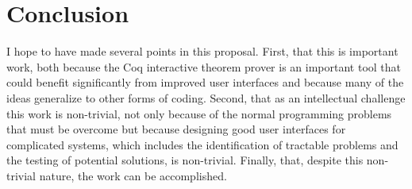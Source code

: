 \documentclass[11pt]{amsart}
\begin{document}
%
%
%
%
%
%
%
%
%
%
%
%

\section{Conclusion}

I hope to have made several points in this proposal.  First, that this is important work, both because the Coq interactive theorem prover is an important tool that could benefit significantly from improved user interfaces and because many of the ideas generalize to other forms of coding.  Second, that as an intellectual challenge this work is non-trivial, not only because of the normal programming problems that must be overcome but because designing good user interfaces for complicated systems, which includes the identification of tractable problems and the testing of potential solutions, is non-trivial.  Finally, that, despite this non-trivial nature, the work can be accomplished.




\end{document}
